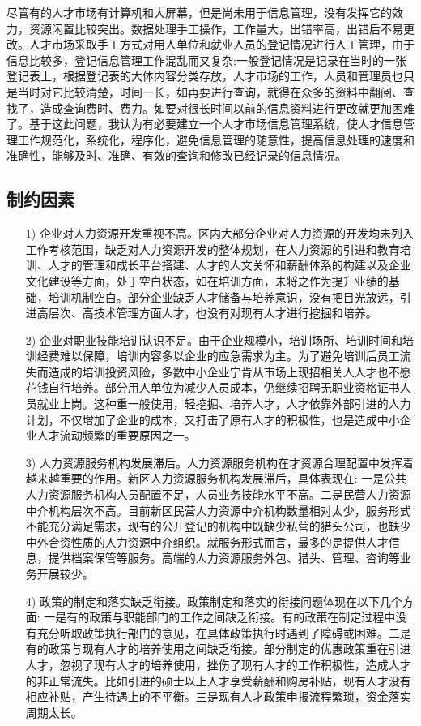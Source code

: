 \documentclass[UTF8]{ctexart}
\begin{document}
尽管有的人才市场有计算机和大屏幕，但是尚未用于信息管理，没有发挥它的效力，资源闲置比较突出。数据处理手工操作，工作量大，出错率高，出错后不易更改。人才市场采取手工方式对用人单位和就业人员的登记情况进行人工管理，由于信息比较多，登记信息管理工作混乱而又复杂;一般登记情况是记录在当时的一张登记表上，根据登记表的大体内容分类存放，人才市场的工作，人员和管理员也只是当时对它比较清楚，时间一长，如再要进行查询，就得在众多的资料中翻阅、查找了，造成查询费时、费力。如要对很长时间以前的信息资料进行更改就更加困难了。基于这此问题，我认为有必要建立一个人才市场信息管理系统，使人才信息管理工作规范化，系统化，程序化，避免信息管理的随意性，提高信息处理的速度和准确性，能够及时、准确、有效的查询和修改已经记录的信息情况。

\subsection{制约因素}
\begin{itemize}
	\item[1)]
		企业对人力资源开发重视不高。区内大部分企业对人力资源的开发均未列入工作考核范围，缺乏对人力资源开发的整体规划，在人力资源的引进和教育培训、人才的管理和成长平台搭建、人才的人文关怀和薪酬体系的构建以及企业文化建设等方面，处于空白状态，如在培训方面，未将之作为提升业绩的基础，培训机制空白。部分企业缺乏人才储备与培养意识，没有把目光放远，引进高层次、高技术管理方面人才，也没有对现有人才进行挖掘和培养。
	\item[2)]
		企业对职业技能培训认识不足。由于企业规模小，培训场所、培训时间和培训经费难以保障，培训内容多以企业的应急需求为主。为了避免培训后员工流失而造成的培训投资风险，多数中小企业宁肯从市场上现招相关人人才也不愿花钱自行培养。部分用人单位为减少人员成本，仍继续招聘无职业资格证书人员就业上岗。这种重一般使用，轻挖掘、培养人才，人才依靠外部引进的人力计划，不仅增加了企业的成本，又打击了原有人才的积极性，也是造成中小企业人才流动频繁的重要原因之一。
	\item[3)]
		人力资源服务机构发展滞后。人力资源服务机构在才资源合理配置中发挥着越来越重要的作用。新区人力资源服务机构发展滞后，具体表现在: 一是公共人力资源服务机构人员配置不足，人员业务技能水平不高。二是民营人力资源中介机构层次不高。目前新区民营人力资源中介机构数量相对太少，服务形式不能充分满足需求，现有的公开登记的机构中既缺少私营的猎头公司，也缺少中外合资性质的人力资源中介组织。就服务形式而言，最多的是提供人才信息，提供档案保管等服务。高端的人力资源服务外包、猎头、管理、咨询等业务开展较少。
	\item[4)]
		政策的制定和落实缺乏衔接。政策制定和落实的衔接问题体现在以下几个方面: 一是有的政策与职能部门的工作之间缺乏衔接。有的政策在制定过程中没有充分听取政策执行部门的意见，在具体政策执行时遇到了障碍或困难。二是有的政策与现有人才的培养使用之间缺乏衔接。部分制定的优惠政策重在引进人才，忽视了现有人才的培养使用，挫伤了现有人才的工作积极性，造成人才的非正常流失。比如引进的硕士以上人才享受薪酬和购房补贴，现有人才没有相应补贴，产生待遇上的不平衡。三是现有人才政策申报流程繁琐，资金落实周期太长。
\end{itemize}
\end{document}
